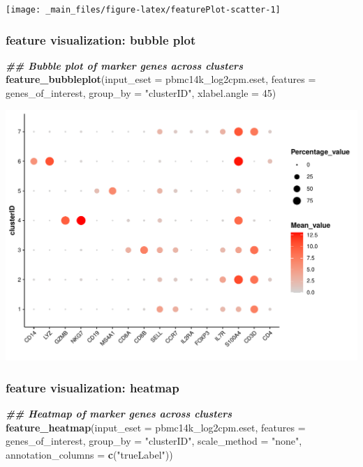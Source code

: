 \documentclass[
  12pt,
]{book}
\newenvironment{Shaded}{\begin{snugshade}}{\end{snugshade}}
\newcommand{\AttributeTok}[1]{\textcolor[rgb]{0.13,0.29,0.53}{#1}}
\newcommand{\DecValTok}[1]{\textcolor[rgb]{0.00,0.00,0.81}{#1}}
\newcommand{\DocumentationTok}[1]{\textcolor[rgb]{0.56,0.35,0.01}{\textbf{\textit{#1}}}}
\newcommand{\FunctionTok}[1]{\textcolor[rgb]{0.13,0.29,0.53}{\textbf{#1}}}
\newcommand{\NormalTok}[1]{#1}
\newcommand{\StringTok}[1]{\textcolor[rgb]{0.31,0.60,0.02}{#1}}
\begin{document}
\begin{center}\texttt{[image: \_main\_files/figure-latex/featurePlot-scatter-1]} \end{center}

\subsubsection{feature visualization: bubble plot}\label{feature-visualization-bubble-plot}

\begin{Shaded}
\begin{Highlighting}[]
\DocumentationTok{\#\# Bubble plot of marker genes across clusters}
\FunctionTok{feature\_bubbleplot}\NormalTok{(}\AttributeTok{input\_eset =}\NormalTok{ pbmc14k\_log2cpm.eset, }\AttributeTok{features =}\NormalTok{ genes\_of\_interest, }\AttributeTok{group\_by =} \StringTok{"clusterID"}\NormalTok{, }\AttributeTok{xlabel.angle =} \DecValTok{45}\NormalTok{)}
\end{Highlighting}
\end{Shaded}

\begin{center}\includegraphics{_main_files/figure-latex/featurePlot-bubble-1} \end{center}

\subsubsection{feature visualization: heatmap}\label{feature-visualization-heatmap}

\begin{Shaded}
\begin{Highlighting}[]
\DocumentationTok{\#\# Heatmap of marker genes across clusters}
\FunctionTok{feature\_heatmap}\NormalTok{(}\AttributeTok{input\_eset =}\NormalTok{ pbmc14k\_log2cpm.eset, }\AttributeTok{features =}\NormalTok{ genes\_of\_interest, }\AttributeTok{group\_by =} \StringTok{"clusterID"}\NormalTok{, }\AttributeTok{scale\_method =} \StringTok{"none"}\NormalTok{, }\AttributeTok{annotation\_columns =} \FunctionTok{c}\NormalTok{(}\StringTok{"trueLabel"}\NormalTok{))}
\end{Highlighting}
\end{Shaded}
\end{document}

